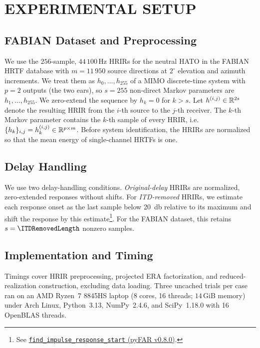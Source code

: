 \documentclass[non-peer-review]{fa2026}
\begin{document}
%
%
%
\section{EXPERIMENTAL SETUP}
\label{sec:experimental-setup}
%
%
\subsection{FABIAN Dataset and Preprocessing}
\label{sec:fabian}
We use the \(256\)-sample, \(44\,100\,\)Hz \acp{HRIR} for the neutral \acs{HATO} in the FABIAN \acs{HRTF} database
\cite{brinkmann2017} with \(m=11\,950\) source directions at \(2^{\circ}\) elevation and azimuth increments. We treat
them as \(h_0,\ldots,h_{255}\) of a \ac{MIMO} discrete-time system with \(p=2\) outputs (the two ears), so \(s=255\)
non-direct Markov parameters are \(h_1,\ldots,h_{255}\). We zero-extend the sequence by \(h_k=0\) for \(k>s\). Let
\(h^{(i,j)}\in\R^{2s}\) denote the resulting HRIR from the \(i\)-th source to the \(j\)-th receiver. The \(k\)-th Markov
parameter contains the \(k\)-th sample of every HRIR, i.e. \(\{h_k\}_{i,j}=h^{(i,j)}_k\in\R[p][m]\). Before system
identification, the \acp{HRIR} are normalized so that the mean energy of single-channel \acp{HRTF} is one.

%
%
\subsection{Delay Handling}
\label{sec:delay-handling}
We use two delay-handling conditions. \emph{Original-delay} \acp{HRIR} are normalized, zero-extended responses
without shifts. For \emph{\ac{ITD}-removed} \acp{HRIR}, we estimate each response onset as the last sample below
\SI{20}{\decibel} relative to its maximum and shift the response by this estimate\footnote{See
  \href{https://pyfar.readthedocs.io/en/v0.8.0/modules/pyfar.dsp.html\#pyfar.dsp.find_impulse_response_start}{\texttt{find\_impulse\_response\_start}
    (pyFAR v0.8.0)}.}. For the FABIAN dataset, this retains \(s=\ITDRemovedLength\) nonzero samples.
%
\subsection{Implementation and Timing}
\label{sec:timing}
Timings cover \ac{HRIR} preprocessing, projected \ac{ERA} factorization, and reduced-realization construction, excluding
data loading. Three uncached trials per case ran on an AMD Ryzen~7 8845HS laptop (8 cores, 16 threads; \(14\)\,GiB
memory) under Arch Linux, Python~3.13, NumPy~2.4.6, and SciPy~1.18.0 with 16 OpenBLAS threads.
\end{document}
